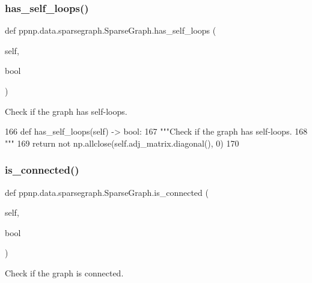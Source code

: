 \subsubsection{\texorpdfstring{has\+\_\+self\+\_\+loops()}{has\_self\_loops()}}
{\footnotesize\ttfamily def ppnp.\+data.\+sparsegraph.\+Sparse\+Graph.\+has\+\_\+self\+\_\+loops (\begin{DoxyParamCaption}\item[{}]{self,  }\item[{}]{bool }\end{DoxyParamCaption})}

\begin{DoxyVerb}Check if the graph has self-loops.
\end{DoxyVerb}
 
\begin{DoxyCode}
166     \textcolor{keyword}{def }has\_self\_loops(self) -> bool:
167         \textcolor{stringliteral}{"""Check if the graph has self-loops.}
168 \textcolor{stringliteral}{        """}
169         \textcolor{keywordflow}{return} \textcolor{keywordflow}{not} np.allclose(self.adj\_matrix.diagonal(), 0)
170 
\end{DoxyCode}
\mbox{\label{classppnp_1_1data_1_1sparsegraph_1_1SparseGraph_a2d6561d1ca1fab1d36c7ff7052475064}} 
\subsubsection{\texorpdfstring{is\+\_\+connected()}{is\_connected()}}
{\footnotesize\ttfamily def ppnp.\+data.\+sparsegraph.\+Sparse\+Graph.\+is\+\_\+connected (\begin{DoxyParamCaption}\item[{}]{self,  }\item[{}]{bool }\end{DoxyParamCaption})}

\begin{DoxyVerb}Check if the graph is connected.
\end{DoxyVerb}
 
